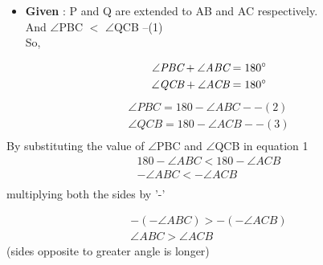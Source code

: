 \begin{frame}
\begin{itemize}

\item \textbf{Given} : P and Q are extended to AB and AC respectively.\\
And $\angle$PBC $<$ $\angle$QCB --(1)\\
So,\\
\end{itemize}
\begin{align*}
\angle\textit{PBC} + \angle\textit{ABC} = 180\degree  \\
\angle\textit{QCB} + \angle\textit{ACB} = 180\degree  \\
\end{align*}
\begin{align*}
\angle\textit{PBC} = 180 - \angle\textit{ABC} --(2)\\
\angle\textit{QCB} = 180 - \angle\textit{ACB} --(3)\\
\end{align*}
By substituting the value of $\angle$PBC and $\angle$QCB in equation 1 \\
\begin{align*}
180 - \angle\textit{ABC} < 180 - \angle\textit{ACB}\\
-\angle\textit{ABC} < -\angle\textit{ACB}\\
\end{align*}
multiplying both the sides by '-'\\
\end{frame}
\begin{frame}
\begin{align*}
-(-\angle\textit{ABC}) >  -(-\angle\textit{ACB})\\
\angle\textit{ABC} > \angle\textit{ACB}
\end{align*}  
 (sides opposite to greater angle is longer)\\
\end{frame}